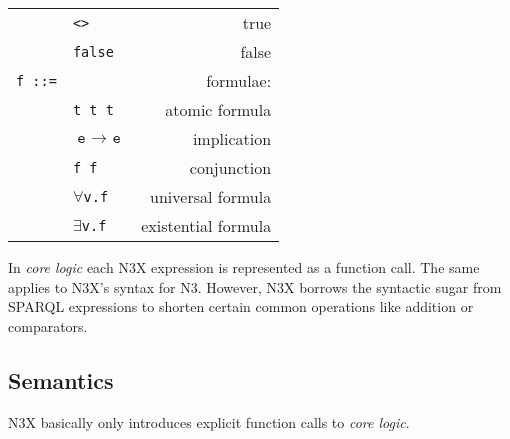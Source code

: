 \documentclass[runningheads]{llncs}
\begin{document}
\begin{table}
\begin{tabular}{llr}
      & \texttt{<>}           & true \\
      & \texttt{false}        & false \\[0.5cm]
    \texttt{f ::=} &          & formulae: \\
      & \texttt{t t t}        & atomic formula \\
      & $\texttt{e } \rightarrow \texttt{ e}$ & implication \\
      & \texttt{f f}          & conjunction \\
      & $\forall$\texttt{v.f} & universal formula \\
      & $\exists$\texttt{v.f} & existential formula \\
    \bottomrule
  \end{tabular}
\end{table}

In \emph{core logic} each N3X expression is represented as a function call.
The same applies to N3X's syntax for N3.
However, N3X borrows the syntactic sugar from SPARQL expressions to shorten certain common operations like addition or comparators.



\subsection{Semantics}
\label{sec:n3x-semantics}

N3X basically only introduces explicit function calls to \emph{core logic}.
\end{document}

